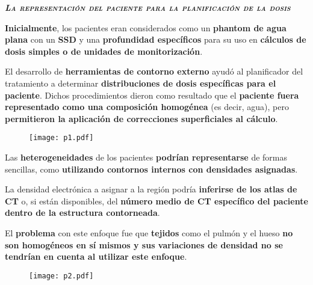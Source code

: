 \documentclass[aspectratio=169,xcolor=dvipsnames,t]{beamer}
\begin{document}


\begin{frame}[standout]
      \centering\LARGE
      \textbf{\itshape\scshape La representación del paciente para la planificación de la dosis}
\end{frame}

\begin{frame}

    \textbf{Inicialmente}, los pacientes eran considerados como un \textbf{phantom de agua plana} con un \textbf{SSD} y una \textbf{profundidad específicos} para su uso en \textbf{cálculos de dosis simples o de unidades de monitorización}.

    El desarrollo de \textbf{herramientas de contorno externo} ayudó al planificador del tratamiento a determinar \textbf{distribuciones de dosis específicas para el paciente}. Dichos procedimientos dieron como resultado que el \textbf{paciente fuera representado como una composición homogénea} (es decir, agua), pero \textbf{permitieron la aplicación de correcciones superficiales al cálculo}.

    \begin{figure}[h]
        \centering
        \texttt{[image: p1.pdf]}
    \end{figure}

\end{frame}

\begin{frame}

    Las \textbf{heterogeneidades} de los pacientes \textbf{podrían representarse} de formas sencillas, como \textbf{utilizando contornos internos con densidades asignadas}.

    La densidad electrónica a asignar a la región podría \textbf{inferirse de los atlas de CT} o, si están disponibles, del \textbf{número medio de CT específico del paciente dentro de la estructura contorneada}.

    El \textbf{problema} con este enfoque fue que \textbf{tejidos} como el pulmón y el hueso \textbf{no son homogéneos en sí mismos y sus variaciones de densidad no se tendrían en cuenta al utilizar este enfoque}.

    \vspace{0.35cm}

    \begin{figure}[h]
        \centering
        \texttt{[image: p2.pdf]}
    \end{figure}

\end{frame}
\end{document}
